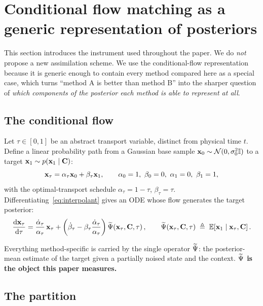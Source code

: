 \section{Conditional flow matching as a generic representation of posteriors}
\label{sec:methods}

This section introduces the instrument used throughout the paper. We do
\emph{not} propose a new assimilation scheme. We use the conditional-flow
representation because it is generic enough to contain every method compared
here as a special case, which turns ``method A is better than method B'' into
the sharper question of \emph{which components of the posterior each method is
able to represent at all}.

\subsection{The conditional flow}

Let $\tau \in [0,1]$ be an abstract transport variable, distinct from physical
time $t$. Define a linear probability path from a Gaussian base sample
$\mathbf{x}_0 \sim \mathcal{N}(0,\sigma_0^2 \mathbb{I})$ to a target
$\mathbf{x}_1 \sim p(\mathbf{x}_1 \mid \mathbf{C})$:
\begin{equation}
  \label{eq:interpolant}
  \mathbf{x}_\tau = \alpha_\tau \mathbf{x}_0 + \beta_\tau \mathbf{x}_1 ,
  \qquad \alpha_0 = 1,\ \beta_0 = 0,\ \alpha_1 = 0,\ \beta_1 = 1 ,
\end{equation}
with the optimal-transport schedule $\alpha_\tau = 1-\tau$,
$\beta_\tau = \tau$. Differentiating~\eqref{eq:interpolant} gives an ODE whose
flow generates the target posterior:
\begin{equation}
  \label{eq:ode}
  \frac{\mathrm{d}\mathbf{x}_\tau}{\mathrm{d}\tau}
  = \frac{\dot\alpha_\tau}{\alpha_\tau}\,\mathbf{x}_\tau
  + \left(\dot\beta_\tau - \beta_\tau\frac{\dot\alpha_\tau}{\alpha_\tau}\right)
    \widetilde{\Psi}\!\left(\mathbf{x}_\tau, \mathbf{C}, \tau\right),
  \qquad
  \widetilde{\Psi}\!\left(\mathbf{x}_\tau, \mathbf{C}, \tau\right) \;\triangleq\; \mathbb{E}\!\left[\mathbf{x}_1 \mid \mathbf{x}_\tau, \mathbf{C}\right].
\end{equation}

Everything method-specific is carried by the single operator $\widetilde{\Psi}$: the
posterior-mean estimate of the target given a partially noised state and the
context. \textbf{$\widetilde{\Psi}$ is the object this paper measures.}

\subsection{The partition}
\label{sec:partition}

